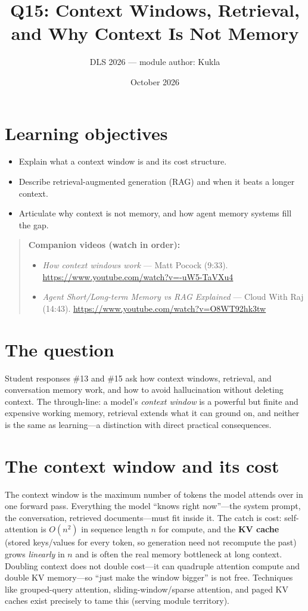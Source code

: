 \documentclass[11pt]{article}
\title{Q15: Context Windows, Retrieval, and Why Context Is Not Memory}
\author{DLS 2026 --- module author: Kukla}
\date{October 2026}
\begin{document}
\maketitle

\section*{Learning objectives}
\begin{itemize}[leftmargin=1.4em]
\item Explain what a context window is and its cost structure.
\item Describe retrieval-augmented generation (RAG) and when it beats a longer context.
\item Articulate why context is not memory, and how agent memory systems fill the gap.
\end{itemize}

\begin{quote}\small\textbf{Companion videos (watch in order):}\begin{itemize}\setlength\itemsep{0pt}\item \emph{How context windows work} --- Matt Pocock (9:33). \url{https://www.youtube.com/watch?v=-uW5-TaVXu4}\item \emph{Agent Short/Long-term Memory vs RAG Explained} --- Cloud With Raj (14:43). \url{https://www.youtube.com/watch?v=O8WT92hk3tw}\end{itemize}\end{quote}

\section{The question}
Student responses \#13 and \#15 ask how context windows, retrieval, and conversation memory work, and how
to avoid hallucination without deleting context. The through-line: a model's \emph{context window} is a
powerful but finite and expensive working memory, retrieval extends what it can ground on, and neither is
the same as learning---a distinction with direct practical consequences.

\section{The context window and its cost}
The context window is the maximum number of tokens the model attends over in one forward pass. Everything
the model ``knows right now''---the system prompt, the conversation, retrieved documents---must fit inside
it. The catch is cost: self-attention is $O(n^2)$ in sequence length $n$ for compute, and the
\textbf{KV cache} (stored keys/values for every token, so generation need not recompute the past) grows
\emph{linearly} in $n$ and is often the real memory bottleneck at long context. Doubling context does not
double cost---it can quadruple attention compute and double KV memory---so ``just make the window bigger''
is not free. Techniques like grouped-query attention, sliding-window/sparse attention, and paged KV caches
exist precisely to tame this (serving module territory).
\end{document}
